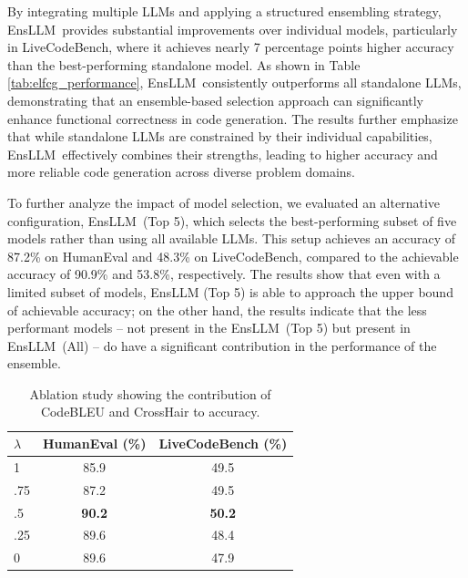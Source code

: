\documentclass{article}
\newcommand{\tool}{EnsLLM}
\begin{document}
By integrating multiple LLMs and applying a structured ensembling strategy, \tool\ provides substantial improvements over individual models, particularly in LiveCodeBench, where it achieves nearly 7 percentage points higher accuracy than the best-performing standalone model. As shown in Table \ref{tab:elfcg_performance}, \tool\ consistently outperforms all standalone LLMs, demonstrating that an ensemble-based selection approach can significantly enhance functional correctness in code generation. The results further emphasize that while standalone LLMs are constrained by their individual capabilities, \tool\ effectively combines their strengths, leading to higher accuracy and more reliable code generation across diverse problem domains.


To further analyze the impact of model selection, we evaluated an alternative configuration, \tool\ (Top 5), which selects the best-performing subset of five models rather than using all available LLMs. This setup achieves an accuracy of 87.2\% on HumanEval and 48.3\% on LiveCodeBench, compared to the achievable accuracy of 90.9\% and 53.8\%, respectively. The results show that even with a limited subset of models, EnsLLM (Top 5) is able to approach the upper bound of achievable accuracy; on the other hand, the results indicate that the less performant models -- not present in the \tool\ (Top 5) but present in \tool\ (All) -- do have a significant contribution in the performance of the ensemble.



\begin{table}[t!]
    \centering
    \caption{Ablation study showing the contribution of CodeBLEU and CrossHair to accuracy.}
    \label{tab:ablation_codebleu_crosshair}
    \begin{tabular}{|l|c|c|}
        \hline
        \textbf{$\lambda$} & \textbf{HumanEval (\%)} & \textbf{LiveCodeBench (\%)} \\
        \hline
        1 & 85.9 & 49.5 \\
        .75 & 87.2 & 49.5 \\
        .5 & \textbf{90.2} & \textbf{50.2} \\
        .25 & 89.6 & 48.4 \\
        0 & 89.6 & 47.9 \\
        
        \hline
    \end{tabular}
\end{table}
\end{document}
